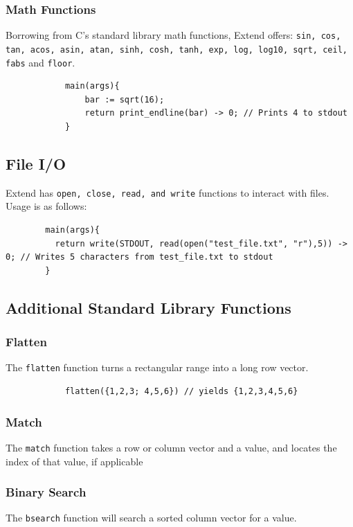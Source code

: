 		\subsubsection{Math Functions}
		Borrowing from C's standard library math functions, Extend offers: \texttt{sin, cos, tan, acos, asin, atan, sinh, cosh, tanh, exp, log, log10, sqrt, ceil, fabs} and \texttt{floor}.

		\begin{lstlisting}
			main(args){
				bar := sqrt(16);
				return print_endline(bar) -> 0; // Prints 4 to stdout
			}
		\end{lstlisting}

	\subsection{File I/O}
	Extend has \texttt{open, close, read, and write} functions to interact with files. Usage is as follows:

	\begin{lstlisting}
		main(args){
		  return write(STDOUT, read(open("test_file.txt", "r"),5)) -> 0; // Writes 5 characters from test_file.txt to stdout
		}
	\end{lstlisting}

	\subsection{Additional Standard Library Functions}

		\subsubsection{Flatten}
		The \texttt{flatten} function turns a rectangular range into a long row vector.

		\begin{lstlisting}
			flatten({1,2,3; 4,5,6}) // yields {1,2,3,4,5,6}
		\end{lstlisting}

		\subsubsection{Match}
		The \texttt{match} function takes a row or column vector and a value, and locates the index of that value, if applicable

		\subsubsection{Binary Search}
		The \texttt{bsearch} function will search a sorted column vector for a value.


